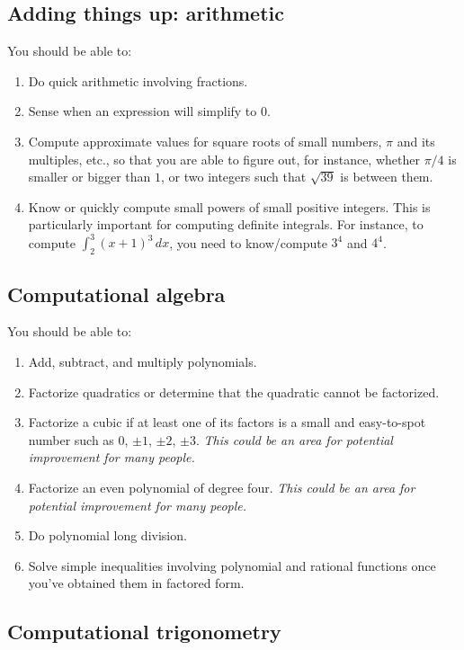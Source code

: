 \documentclass[10pt]{amsart}
\begin{document}
\subsection{Adding things up: arithmetic}

You should be able to:

\begin{enumerate}
\item Do quick arithmetic involving fractions.
\item Sense when an expression will simplify to $0$.
\item Compute approximate values for square roots of small numbers,
  $\pi$ and its multiples, etc., so that you are able to figure out,
  for instance, whether $\pi/4$ is smaller or bigger than $1$, or two
  integers such that $\sqrt{39}$ is between them.
\item Know or quickly compute small powers of small positive
  integers. This is particularly important for computing definite
  integrals. For instance, to compute $\int_2^3 (x + 1)^3 \, dx$, you
  need to know/compute $3^4$ and $4^4$.
\end{enumerate}

\subsection{Computational algebra}

You should be able to:

\begin{enumerate}
\item Add, subtract, and multiply polynomials.
\item Factorize quadratics or determine that the quadratic cannot be
  factorized.
\item Factorize a cubic if at least one of its factors is a small and
  easy-to-spot number such as $0$, $\pm 1$, $\pm 2$, $\pm 3$. {\em
  This could be an area for potential improvement for many people.}
\item Factorize an even polynomial of degree four. {\em This could be
  an area for potential improvement for many people.}
\item Do polynomial long division.
\item Solve simple inequalities involving polynomial and rational
  functions once you've obtained them in factored form.
\end{enumerate}

\subsection{Computational trigonometry}
\end{document}
